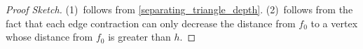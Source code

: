 \documentclass{patmorin}
\begin{document}
\begin{proof}[Proof Sketch]
    (1)~follows from \cref{separating_triangle_depth}. (2)~follows from the fact that each edge contraction can only decrease the distance from $f_0$ to a vertex whose distance from $f_0$ is greater than $h$.
\end{proof}
\end{document}
